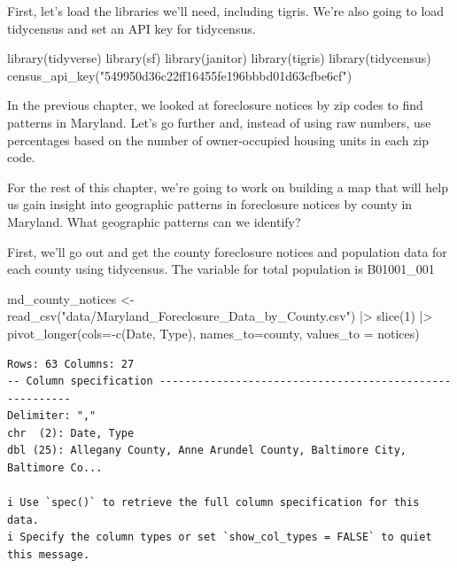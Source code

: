 \documentclass[
  letterpaper,
  DIV=11,
  numbers=noendperiod]{scrreprt}
\newenvironment{Shaded}{\begin{snugshade}}{\end{snugshade}}
\newcommand{\AttributeTok}[1]{\textcolor[rgb]{0.40,0.45,0.13}{#1}}
\newcommand{\DecValTok}[1]{\textcolor[rgb]{0.68,0.00,0.00}{#1}}
\newcommand{\FunctionTok}[1]{\textcolor[rgb]{0.28,0.35,0.67}{#1}}
\newcommand{\NormalTok}[1]{\textcolor[rgb]{0.00,0.23,0.31}{#1}}
\newcommand{\OtherTok}[1]{\textcolor[rgb]{0.00,0.23,0.31}{#1}}
\newcommand{\SpecialCharTok}[1]{\textcolor[rgb]{0.37,0.37,0.37}{#1}}
\newcommand{\StringTok}[1]{\textcolor[rgb]{0.13,0.47,0.30}{#1}}
\begin{document}
First, let's load the libraries we'll need, including tigris. We're also
going to load tidycensus and set an API key for tidycensus.

\begin{Shaded}
\begin{Highlighting}[]
\FunctionTok{library}\NormalTok{(tidyverse)}
\FunctionTok{library}\NormalTok{(sf)}
\FunctionTok{library}\NormalTok{(janitor)}
\FunctionTok{library}\NormalTok{(tigris)}
\FunctionTok{library}\NormalTok{(tidycensus)}
\FunctionTok{census\_api\_key}\NormalTok{(}\StringTok{"549950d36c22ff16455fe196bbbd01d63cfbe6cf"}\NormalTok{)}
\end{Highlighting}
\end{Shaded}

In the previous chapter, we looked at foreclosure notices by zip codes
to find patterns in Maryland. Let's go further and, instead of using raw
numbers, use percentages based on the number of owner-occupied housing
units in each zip code.

For the rest of this chapter, we're going to work on building a map that
will help us gain insight into geographic patterns in foreclosure
notices by county in Maryland. What geographic patterns can we identify?

First, we'll go out and get the county foreclosure notices and
population data for each county using tidycensus. The variable for total
population is B01001\_001

\begin{Shaded}
\begin{Highlighting}[]
\NormalTok{md\_county\_notices }\OtherTok{\textless{}{-}} \FunctionTok{read\_csv}\NormalTok{(}\StringTok{"data/Maryland\_Foreclosure\_Data\_by\_County.csv"}\NormalTok{) }\SpecialCharTok{|\textgreater{}} \FunctionTok{slice}\NormalTok{(}\DecValTok{1}\NormalTok{) }\SpecialCharTok{|\textgreater{}} \FunctionTok{pivot\_longer}\NormalTok{(}\AttributeTok{cols=}\SpecialCharTok{{-}}\FunctionTok{c}\NormalTok{(}\StringTok{\textquotesingle{}Date\textquotesingle{}}\NormalTok{, }\StringTok{\textquotesingle{}Type\textquotesingle{}}\NormalTok{), }\AttributeTok{names\_to=}\StringTok{\textquotesingle{}county\textquotesingle{}}\NormalTok{, }\AttributeTok{values\_to =} \StringTok{\textquotesingle{}notices\textquotesingle{}}\NormalTok{)}
\end{Highlighting}
\end{Shaded}

\begin{verbatim}
Rows: 63 Columns: 27
-- Column specification --------------------------------------------------------
Delimiter: ","
chr  (2): Date, Type
dbl (25): Allegany County, Anne Arundel County, Baltimore City, Baltimore Co...

i Use `spec()` to retrieve the full column specification for this data.
i Specify the column types or set `show_col_types = FALSE` to quiet this message.
\end{verbatim}
\end{document}
